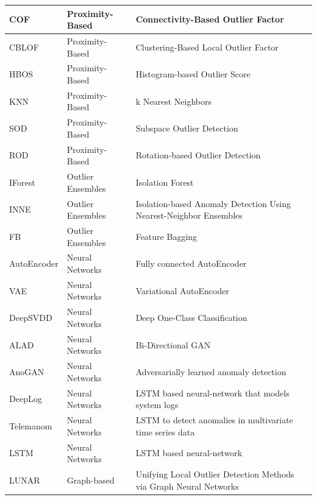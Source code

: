 \begin{table}
{\begin{tabular}{|l|l|l|}
\hline
COF            & Proximity-Based   & Connectivity-Based Outlier Factor                                       \\ 
\hline
CBLOF          & Proximity-Based   & Clustering-Based Local Outlier Factor                                   \\ 
\hline
HBOS           & Proximity-Based   & Histogram-based Outlier Score                                           \\ 
\hline
KNN            & Proximity-Based   & k Nearest Neighbors                                                     \\ 
\hline
SOD            & Proximity-Based   & Subspace Outlier Detection                                              \\ 
\hline
ROD            & Proximity-Based   & Rotation-based Outlier Detection                                        \\ 
\hline
IForest        & Outlier Ensembles & Isolation Forest                                                        \\ 
\hline
INNE           & Outlier Ensembles & Isolation-based Anomaly Detection Using Nearest-Neighbor Ensembles      \\ 
\hline
FB             & Outlier Ensembles & Feature Bagging                                                         \\ 
\hline
AutoEncoder    & Neural Networks   & Fully connected AutoEncoder                                             \\ 
\hline
VAE            & Neural Networks   & Variational AutoEncoder                                                 \\ 
\hline
DeepSVDD       & Neural Networks   & Deep One-Class Classification                                           \\ 
\hline
ALAD           & Neural Networks   & Bi-Directional GAN                                                      \\ 
\hline
AnoGAN         & Neural Networks   & Adversarially learned anomaly detection                                 \\ 
\hline
DeepLog        & Neural Networks   & LSTM based neural-network that models system logs                       \\ 
\hline
Telemanom      & Neural Networks   & LSTM to detect anomalies in multivariate time series data               \\ 
\hline
LSTM           & Neural Networks   & LSTM based neural-network                                               \\ 
\hline
LUNAR          & Graph-based       & Unifying Local Outlier Detection Methods via Graph Neural Networks      \\
\hline
\end{tabular}
}
\end{table}







